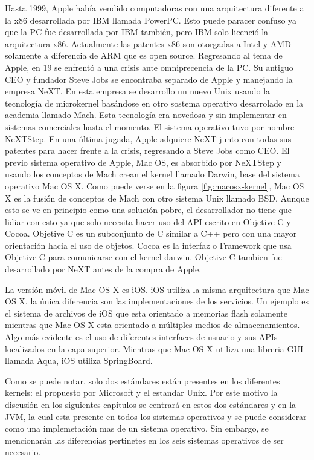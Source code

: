 Hasta 1999, Apple había vendido computadoras con una arquitectura diferente a
la x86 desarrollada por IBM llamada PowerPC. Esto puede paracer confuso ya que
la PC fue desarrollada por IBM también, pero IBM solo licenció la arquitectura
x86. Actualmente las patentes x86 son otorgadas a Intel y AMD solamente a
diferencia de ARM que es open source. Regresando al tema de Apple, en 19 se
enfrentó a una crisis ante omniprecencia de la PC. Su antiguo CEO y fundador
Steve Jobs se encontraba separado de Apple y manejando la empresa NeXT. En esta
empresa se desarrollo un nuevo Unix usando la tecnología de microkernel
basándose en otro sostema operativo desarrolado en la academia llamado
Mach. Esta tecnología era novedosa y sin implementar en sistemas comerciales
hasta el momento. El sistema operativo tuvo por nombre NeXTStep. En una última
jugada, Apple adquiere NeXT junto con todas sus patentes para hacer frente a la
crisis, regresando a Steve Jobs como CEO. El previo sistema operativo de Apple,
Mac OS, es absorbido por NeXTStep y usando los conceptos de Mach crean el
kernel llamado Darwin, base del sistema operativo Mac OS X.  Como puede verse
en la figura \ref{fig:macosx-kernel}, Mac OS X es la fusión de conceptos de
Mach con otro sistema Unix llamado BSD. Aunque esto se ve en principio como una
solución pobre, el desarrollador no tiene que lidiar con esto ya que solo
necesita hacer uso del API escrito en Objetive C y Cocoa. Objetive C es un
subconjunto de C similar a C++ pero con una mayor orientación hacia el uso de
objetos. Cocoa es la interfaz o Framework que usa Objetive C para comunicarse
con el kernel darwin. Objetive C tambien fue desarrollado por NeXT antes de la
compra de Apple.

La versión móvil de Mac OS X es iOS. iOS utiliza la misma arquitectura que Mac
OS X. la única diferencia son las implementaciones de los servicios. Un ejemplo
es el sistema de archivos de iOS que esta orientado a memorias flash solamente
mientras que Mac OS X esta orientado a múltiples medios de
almacenamientos. Algo más evidente es el uso de diferentes interfaces de
usuario y sus APIs localizados en la capa superior. Mientras que Mac OS X
utiliza una libreria GUI llamada Aqua, iOS utiliza SpringBoard.

Como se puede notar, solo dos estándares están presentes en los diferentes
kernels: el propuesto por Microsoft y el estandar Unix. Por este motivo la
discusión en los siguientes capítulos se centrará en estos dos estándares y en
la JVM, la cual esta presente en todos los sistemas operativos y se puede
considerar como una implemetación mas de un sistema operativo. Sin embargo, se
mencionarán las diferencias pertinetes en los seis sistemas operativos de ser
necesario.

